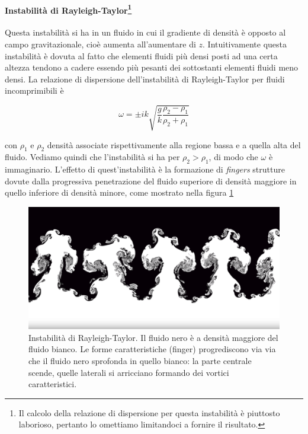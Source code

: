 \paragraph[Instabilità di Rayleigh-Taylor]{Instabilità di Rayleigh-Taylor\footnote{Il calcolo della relazione di dispersione per questa instabilità è piuttosto laborioso, pertanto lo omettiamo limitandoci a fornire il risultato.}}
Questa instabilità si ha in un fluido in cui il gradiente di densità è opposto al campo gravitazionale, cioè aumenta all'aumentare di $z$. Intuitivamente questa instabilità è dovuta al fatto che elementi fluidi più densi posti ad una certa altezza tendono a cadere essendo più pesanti dei sottostanti elementi fluidi meno densi. La relazione di dispersione dell'instabilità di Rayleigh-Taylor per fluidi incomprimibili è 
\begin{EQ}
\begin{equation}
\omega=\pm i k \sqrt{\dfrac{g}{k}\dfrac{\rho_2-\rho_1}{\rho_2+\rho_1}}
\end{equation}
\end{EQ}
con $\rho_1$ e $\rho_2$ densità associate rispettivamente alla regione bassa e a quella alta del fluido. Vediamo quindi che l'instabilità si ha per $\rho_2>\rho_1$, di modo che $\omega$ è immaginario.
L'effetto di quest'instabilità è la formazione di \textit{fingers} strutture dovute dalla progressiva penetrazione del fluido superiore di densità maggiore in quello inferiore di densità minore, come mostrato nella figura \ref{im:RayleighTaylor}
\begin{figure}
\includegraphics[width=\textwidth]{img/Rayleigh}
\caption{Instabilità di Rayleigh-Taylor. Il fluido nero è a densità maggiore del fluido bianco. Le forme caratteristiche (finger) progrediscono via via che il fluido nero sprofonda in quello bianco: la parte centrale scende, quelle laterali si arricciano formando dei vortici caratteristici. }
\label{im:RayleighTaylor}
\end{figure}

